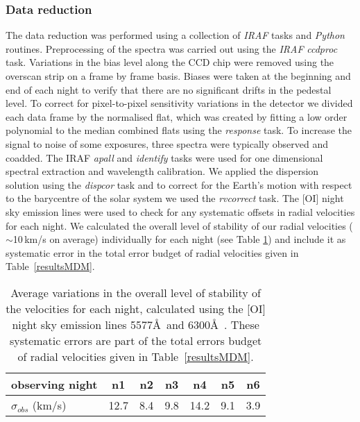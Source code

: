 \documentclass[useAMS,usenatbib]{mn2e}
\begin{document}
\subsubsection{Data reduction}
The data reduction was performed using a collection of \textit{IRAF} tasks and \textit{Python} routines. 
Preprocessing of the spectra was carried out using the \textit{IRAF} \textit{ccdproc} task. Variations in the bias level along the CCD chip were removed using the overscan strip on a frame by frame basis. Biases were taken at the beginning and end of each night to verify that there are no significant drifts in the pedestal level. To correct for pixel-to-pixel sensitivity variations in the detector we divided each data frame by the normalised flat, which was created by fitting a low order polynomial to the median combined flats using the \textit{response} task. To increase the signal to noise of some exposures, three spectra were typically observed and coadded.
The IRAF \textit{apall} and \textit{identify} tasks were used for one dimensional spectral extraction and wavelength calibration. We applied the dispersion solution using the \textit{dispcor} task and to correct for the Earth's motion with respect to the barycentre of the solar system we used the \textit{rvcorrect} task. The [OI] night sky emission lines 
were used to check for any systematic offsets in radial velocities for each night. We calculated the overall level of stability of our radial velocities ($\sim$10\,km/s on average) individually for each night (see Table \ref{errors}) and include it as systematic error in the total error budget of radial velocities given in Table~\ref{resultsMDM}.
%
\setcounter{table}{0}
\begin{table}
 \centering
 \begin{minipage}{80mm}
  \caption{Average variations in the overall level of stability of the velocities for each night, calculated using the [OI] night sky emission lines 5577\AA~and 6300\AA~. These systematic errors are part of the total errors budget of radial velocities given in Table~\ref{resultsMDM}. }
   \label{errors}
\begin{tabular}{l | c c c c c c }
 \hline
\setcounter{table}{0}
  observing night  &  n1 & n2 & n3 & n4 & n5 & n6 \\
   \hline
$\sigma_{obs}$ (km/s)  & 12.7 & 8.4 & 9.8 & 14.2 & 9.1 & 3.9 \\
\end{tabular}
\end{minipage}
\end{table}
%
\end{document}
